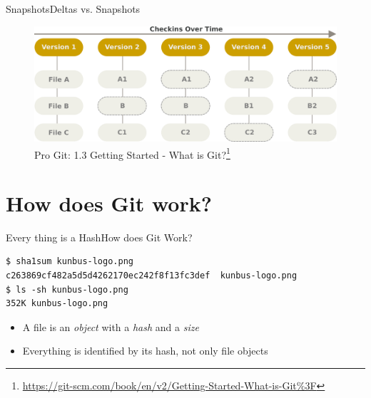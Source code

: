 \documentclass[aspectratio=169]{beamer}
\begin{document}
\begin{frame}{Snapshots}{Deltas vs. Snapshots}
\begin{figure}
    \centering
    \includegraphics[width=\textwidth,height=0.6\textheight,keepaspectratio]{snapshots}
    \caption{
        Pro Git: 1.3 Getting Started - What is Git?\footnote{\url{https://git-scm.com/book/en/v2/Getting-Started-What-is-Git\%3F}}
    }
\end{figure}
\end{frame}

\section{How does Git work?}
\begin{frame}[fragile]{Every thing is a Hash}{How does Git Work?}
\begin{verbatim}
$ sha1sum kunbus-logo.png 
c263869cf482a5d5d4262170ec242f8f13fc3def  kunbus-logo.png
$ ls -sh kunbus-logo.png 
352K kunbus-logo.png
\end{verbatim}
\begin{itemize}
    \item A file is an \emph{object} with a \emph{hash} and a \emph{size}
    \item Everything is identified by its hash, not only file objects
\end{itemize}
\end{frame}
\end{document}
